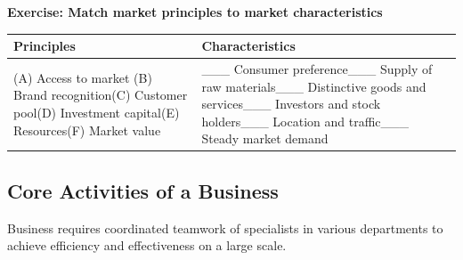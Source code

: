 \documentclass[]{book}
\let\BeginKnitrBlock\begin \let\EndKnitrBlock\end
\begin{document}
\BeginKnitrBlock{rmdexercise}
\textbf{Exercise: Match market principles to market characteristics}

\begin{longtable}[]{@{}ll@{}}
\toprule
\begin{minipage}[b]{0.44\columnwidth}\raggedright
Principles\strut
\end{minipage} & \begin{minipage}[b]{0.50\columnwidth}\raggedright
Characteristics\strut
\end{minipage}\tabularnewline
\midrule
\endhead
\begin{minipage}[t]{0.44\columnwidth}\raggedright
(A) Access to market \newline(B) Brand recognition\newline (C) Customer pool\newline(D) Investment capital\newline(E) Resources\newline(F) Market value\strut
\end{minipage} & \begin{minipage}[t]{0.50\columnwidth}\raggedright
\_\_\_ Consumer preference\newline  \_\_\_ Supply of raw materials\newline \_\_\_ Distinctive goods and services\newline \_\_\_ Investors and stock holders\newline \_\_\_ Location and traffic\newline \_\_\_ Steady market demand\strut
\end{minipage}\tabularnewline
\bottomrule
\end{longtable}
\EndKnitrBlock{rmdexercise}

\hypertarget{core-activities-of-a-business}{%
\subsection{Core Activities of a Business}\label{core-activities-of-a-business}}

Business requires coordinated teamwork of specialists in various departments to achieve efficiency and effectiveness on a large scale.
\end{document}
